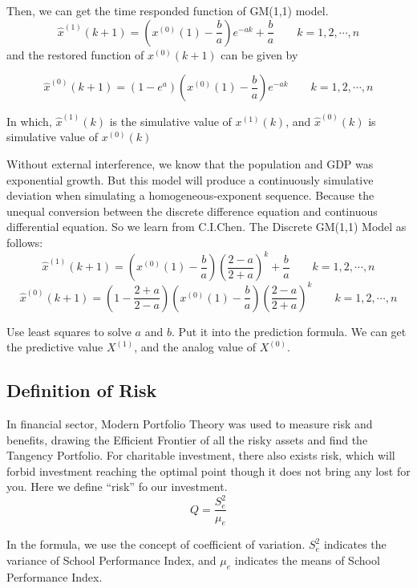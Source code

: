 \documentclass{mcmthesis}
\newcommand{\upcite}[1]{\textsuperscript{\textsuperscript{\cite{#1}}}}
\begin{document}
Then, we can get the time responded function of GM(1,1) model.
\begin{equation}
\hat{x}^{(1)}(k+1) = (x^{(0)}(1) - \frac{b}{a})e^{-a k} + \frac{b}{a} \qquad k = 1, 2, \cdots, n
\end{equation}
and the restored function of $x^{(0)}(k + 1)$ can be given by

\begin{equation}
\hat{x}^{(0)}(k+1) = (1 - e^a)(x^{(0)}(1) - \frac{b}{a})e^{-a k} \qquad k = 1, 2, \cdots, n
\end{equation}

\par In which, $\hat{x}^{(1)}(k)$ is the simulative value of  $x^{(1)}(k)$, and  $\hat{x}^{(0)}(k)$ is simulative value of $x^{(0)}(k)$

\par Without external interference, we know that the population and GDP was exponential growth. But this model will produce a continuously simulative deviation when simulating a homogeneous-exponent sequence. Because the unequal conversion between the discrete difference equation and continuous differential equation. So we learn from C.I.Chen\upcite{}. The Discrete GM(1,1) Model as follows:
\begin{equation}
\hat{x}^{(1)}(k+1) = (x^{(0)}(1) - \frac{b}{a})(\frac{2 - a}{2 + a})^k+ \frac{b}{a} \qquad k = 1, 2, \cdots, n
\end{equation}
\begin{equation}
\hat{x}^{(0)}(k+1) = (1 - \frac{2 + a}{2 - a})(x^{(0)}(1) - \frac{b}{a})(\frac{2 - a}{2 + a})^k \qquad k = 1, 2, \cdots, n
\end{equation}
\par Use least squares to solve $a$ and $b$. Put it into the prediction formula. We can get the predictive value $X^{(1)}$, and the analog value of $X^{(0)}$.\\




\subsection{Definition of Risk}

\par In financial sector, Modern Portfolio Theory was used to measure risk and benefits, drawing the Efficient Frontier of all the risky assets and find the Tangency Portfolio\upcite{PT}.  For charitable investment, there also exists risk, which will forbid investment reaching the optimal point though it does not bring any lost for you. Here we define “risk” fo our investment.
	\begin{equation}
		\label{risk}
		Q = \frac{S^2_e}{\mu_e}
	\end{equation}
\par In the formula, we use the concept of coefficient of variation. $S^2_e$ indicates the variance of School Performance Index, and $\mu_e$ indicates the means of School Performance Index. 
\end{document}
